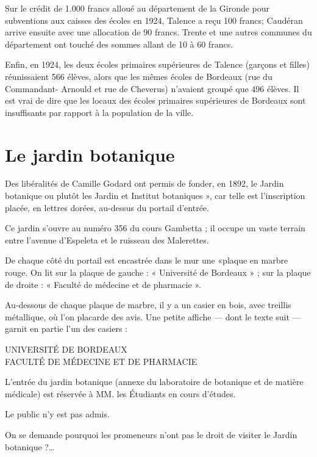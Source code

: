 \documentclass[a4paper,11pt]{book}
\begin{document}
Sur le crédit de 1.000 francs alloué au département de la Gironde pour subventions aux caisses des écoles en 1924, Talence a reçu 100 francs; Caudéran arrive ensuite avec une allocation de 90 francs. Trente et une autres communes du département ont touché des sommes allant de 10 à 60 francs.

Enfin, en 1924, les deux écoles primaires supérieures de Talence (garçons et filles) réunissaient 566 élèves, alors que les mêmes écoles de Bordeaux (rue du Commandant-
Arnould et rue de Cheverus) n'avaient groupé que 496 élèves. Il est vrai de dire que les locaux des écoles primaires supérieures de Bordeaux sont insuffisants par rapport à
la population de la ville. 

\section{Le jardin botanique}

Des libéralités de Camille Godard ont permis de fonder, en 1892, le Jardin botanique ou plutôt les Jardin et Institut botaniques », car telle est l'inscription placée, en lettres dorées, au-dessus du portail d'entrée.

Ce jardin s'ouvre au numéro 356 du cours Gambetta ; il occupe un vaste terrain entre l'avenue d'Espeleta et le ruisseau des Malerettes.

De chaque côté du portail est encastrée dans le mur une «plaque en marbre rouge. On lit sur la plaque de gauche : « Université de Bordeaux » ; sur la plaque de droite : « Faculté de médecine et de pharmacie ».

Au-dessous de chaque plaque de marbre, il y a un casier en bois, avec treillis métallique, où l'on placarde des avis. Une petite affiche — dont le texte suit — garnit en partie l'un des casiers :

\begin{small}
\begin{center}
\textsc{UNIVERSITÉ DE BORDEAUX\\
FACULTÉ DE MÉDECINE ET DE PHARMACIE}
\end{center}

L'entrée du jardin botanique (annexe du laboratoire de botanique et de matière médicale) est réservée à MM. les Étudiants en cours d'études.

Le public n'y est pas admis.
\end{small}


On se demande pourquoi les promeneurs n'ont pas le droit de visiter le Jardin botanique ?\dots
\end{document}
